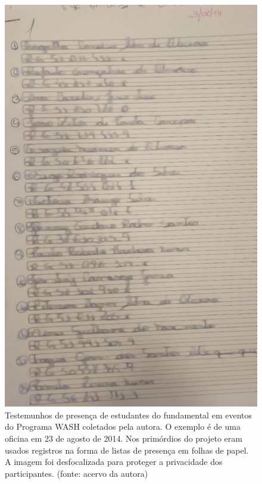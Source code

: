 \documentclass[
12pt,		%
openright,	%
twoside,  %
a4paper,			%
chapter=TITLE,		%
english,			%
french,				%
spanish,			%
brazil				%
]{USPSC-classe/USPSC}
\begin{document}
\captionsetup{format=plain}
\begin{figure}[max size={\textwidth}{\textheight}]

\centering


\begin{minipage}[b]{0.4\linewidth}
        \centering
                \includegraphics[width=1.0\linewidth]{../../imagens/blurred-Presenca-Oficina-2014-08-23.jpeg}
                \caption{Testemunhos de presen\c{c}a de estudantes do fundamental em eventos do Programa WASH coletados pela autora. O exemplo \'e de uma oficina em 23 de agosto de 2014. Nos prim\'ordios do projeto eram usados registros na forma de listas de presen\c{c}a em folhas de papel. A imagem foi desfocalizada para proteger a privacidade dos participantes. (fonte: acervo da autora)}

\end{minipage}
\end{figure}
\end{document}
